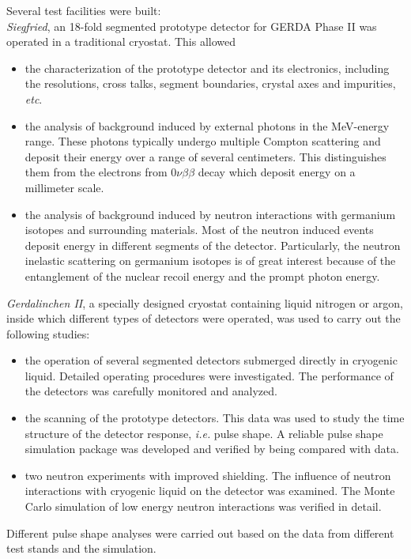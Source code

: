 Several test facilities were built:\\
\emph{Siegfried}, an 18-fold segmented prototype detector for GERDA
Phase II was operated in a traditional cryostat. This allowed
\begin{itemize}
\item the characterization of the prototype detector and its
  electronics, including the resolutions, cross talks, segment
  boundaries, crystal axes and impurities, \textit{etc}.
\item the analysis of background induced by external photons in the
  MeV-energy range. These photons typically undergo multiple Compton
  scattering and deposit their energy over a range of several
  centimeters. This distinguishes them from the electrons from
  $0\nu\beta\beta$ decay which deposit energy on a millimeter
  scale.
\item the analysis of background induced by neutron interactions with
  germanium isotopes and surrounding materials. Most of the neutron
  induced events deposit energy in different segments of the detector.
  Particularly, the neutron inelastic scattering on germanium isotopes
  is of great interest because of the entanglement of the nuclear
  recoil energy and the prompt photon energy.
\end{itemize}
\emph{Gerdalinchen II}, a specially designed cryostat containing
liquid nitrogen or argon, inside which different types of detectors
were operated, was used to carry out the following studies:
\begin{itemize}
\item the operation of several segmented detectors submerged directly
  in cryogenic liquid. Detailed operating procedures were
  investigated. The performance of the detectors was carefully
  monitored and analyzed.
\item the scanning of the prototype detectors. This data was used to
  study the time structure of the detector response, \textit{i.e.}
  pulse shape. A reliable pulse shape simulation package was developed
  and verified by being compared with data.
\item two neutron experiments with improved shielding. The influence
  of neutron interactions with cryogenic liquid on the detector was
  examined. The Monte Carlo simulation of low energy neutron
  interactions was verified in detail.
\end{itemize}
Different pulse shape analyses were carried out based on the data from
different test stands and the simulation.

